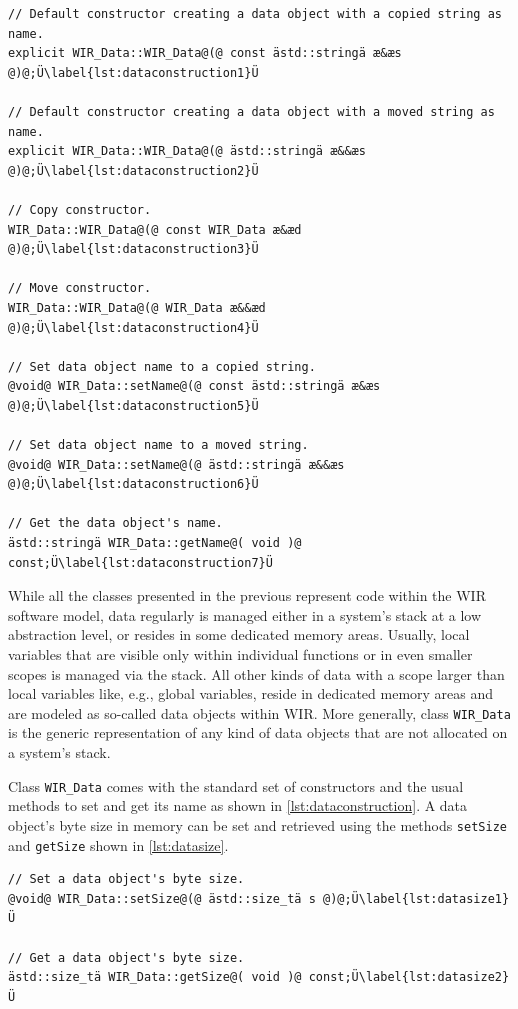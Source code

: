 \begin{lstlisting}[style=code,float=!b,caption={Constructors and Methods for Name Handling of Class \texttt{WIR\_Data}},label=lst:dataconstruction]
// Default constructor creating a data object with a copied string as name.
explicit WIR_Data::WIR_Data@(@ const ästd::stringä æ&æs @)@;Ü\label{lst:dataconstruction1}Ü

// Default constructor creating a data object with a moved string as name.
explicit WIR_Data::WIR_Data@(@ ästd::stringä æ&&æs @)@;Ü\label{lst:dataconstruction2}Ü

// Copy constructor.
WIR_Data::WIR_Data@(@ const WIR_Data æ&æd @)@;Ü\label{lst:dataconstruction3}Ü

// Move constructor.
WIR_Data::WIR_Data@(@ WIR_Data æ&&æd @)@;Ü\label{lst:dataconstruction4}Ü

// Set data object name to a copied string.
@void@ WIR_Data::setName@(@ const ästd::stringä æ&æs @)@;Ü\label{lst:dataconstruction5}Ü

// Set data object name to a moved string.
@void@ WIR_Data::setName@(@ ästd::stringä æ&&æs @)@;Ü\label{lst:dataconstruction6}Ü

// Get the data object's name.
ästd::stringä WIR_Data::getName@( void )@ const;Ü\label{lst:dataconstruction7}Ü
\end{lstlisting}

While all the classes presented in the previous  represent code within the \gls{WIR} software model, data regularly is managed either in a system's stack at a low abstraction level, or resides in some dedicated memory areas.
Usually, local variables that are visible only within individual functions or in even smaller scopes is managed via the stack.
All other kinds of data with a scope larger than local variables like, e.g., global variables, reside in dedicated memory areas and are modeled as so-called data objects within \gls{WIR}.
More generally, class \texttt{WIR\_Data} is the generic representation of any kind of data objects that are not allocated on a system's stack.

Class \texttt{WIR\_Data} comes with the standard set of constructors and the usual methods to set and get its name as shown in \cref{lst:dataconstruction}.
A data object's byte size in memory can be set and retrieved using the methods \texttt{setSize} and \texttt{getSize} shown in \cref{lst:datasize}.

\begin{lstlisting}[style=code,float=t,caption={Size Computation by Class \texttt{WIR\_Data}},label=lst:datasize]
// Set a data object's byte size.
@void@ WIR_Data::setSize@(@ ästd::size_tä s @)@;Ü\label{lst:datasize1}Ü

// Get a data object's byte size.
ästd::size_tä WIR_Data::getSize@( void )@ const;Ü\label{lst:datasize2}Ü
\end{lstlisting}

